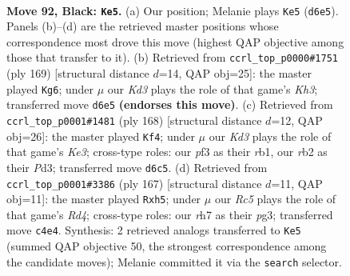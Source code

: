 \documentclass[11pt]{article}
\begin{document}
\clearpage

\begin{figure}[p]\centering
\begin{subfigure}{0.46\textwidth}\centering
\resizebox{\linewidth}{!}{%
\newchessgame
\chessboard[
  setfen={8/7R/3kpp2/8/P1r1P3/5P2/1R4K1/8 b - - 11 92},
  showmover=false,
  pgfstyle=straightmove, color=movearrow, markmove={d6-e5}
]}
\caption{}
\end{subfigure}\hfill
\begin{subfigure}{0.46\textwidth}\centering
\resizebox{\linewidth}{!}{%
\newchessgame
\chessboard[
  setfen={8/8/5p1k/P2R3p/7P/r5P1/6K1/8 b - - 18 85},
  showmover=false,
  pgfstyle=straightmove, color=movearrow, markmove={h6-g6}
]}
\caption{}
\end{subfigure}
\\[4pt]
\begin{subfigure}{0.46\textwidth}\centering
\resizebox{\linewidth}{!}{%
\newchessgame
\chessboard[
  setfen={8/8/4k3/1R5p/6pP/1p1PK1P1/8/1r6 w - - 0 85},
  showmover=false,
  pgfstyle=straightmove, color=movearrow, markmove={e3-f4}
]}
\caption{}
\end{subfigure}\hfill
\begin{subfigure}{0.46\textwidth}\centering
\resizebox{\linewidth}{!}{%
\newchessgame
\chessboard[
  setfen={8/7k/7p/3r3P/4R3/6P1/4KP2/8 b - - 0 84},
  showmover=false,
  pgfstyle=straightmove, color=movearrow, markmove={d5-h5}
]}
\caption{}
\end{subfigure}
\caption{\textbf{Move 92, Black: \texttt{Ke5}.} (a) Our position; Melanie plays \texttt{Ke5} (\texttt{d6e5}). Panels (b)--(d) are the retrieved master positions whose correspondence most drove this move (highest QAP objective among those that transfer to it). (b) Retrieved from \texttt{ccrl\_top\_p0000\#1751} (ply 169) [structural distance $d$=14, QAP obj=25]: the master played \texttt{Kg6}; under $\mu$ our \emph{Kd3} plays the role of that game's \emph{Kh3}; transferred move \texttt{d6e5} \textbf{(endorses this move)}. (c) Retrieved from \texttt{ccrl\_top\_p0001\#1481} (ply 168) [structural distance $d$=12, QAP obj=26]: the master played \texttt{Kf4}; under $\mu$ our \emph{Kd3} plays the role of that game's \emph{Ke3}; cross-type roles: our \emph{p}f3 as their \emph{r}b1, our \emph{r}b2 as their \emph{P}d3; transferred move \texttt{d6c5}. (d) Retrieved from \texttt{ccrl\_top\_p0001\#3386} (ply 167) [structural distance $d$=11, QAP obj=11]: the master played \texttt{Rxh5}; under $\mu$ our \emph{Rc5} plays the role of that game's \emph{Rd4}; cross-type roles: our \emph{r}h7 as their \emph{p}g3; transferred move \texttt{c4e4}. Synthesis: 2 retrieved analogs transferred to \texttt{Ke5} (summed QAP objective 50, the strongest correspondence among the candidate moves); Melanie committed it via the \texttt{search} selector.}
\label{fig:thought-m183}
\end{figure}
\end{document}

